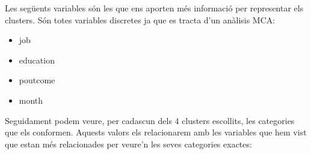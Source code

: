 \documentclass[
]{article}
\newenvironment{Shaded}{\begin{snugshade}}{\end{snugshade}}
\newcommand{\NormalTok}[1]{#1}
\newcommand{\SpecialCharTok}[1]{\textcolor[rgb]{0.00,0.00,0.00}{#1}}
\providecommand{\tightlist}{%
  \setlength{\itemsep}{0pt}\setlength{\parskip}{0pt}}
\begin{document}
Les següents variables són les que ens aporten més informació per
representar els clusters. Són totes variables discretes ja que es tracta
d'un anàlisis MCA:

\begin{itemize}
\tightlist
\item
  job
\item
  education
\item
  poutcome
\item
  month
\end{itemize}

Seguidament podem veure, per cadascun dels 4 clusters escollits, les
categories que els conformen. Aquests valors els relacionarem amb les
variables que hem vist que estan més relacionades per veure'n les seves
categories exactes:

\begin{Shaded}
\end{Shaded}
\end{document}
